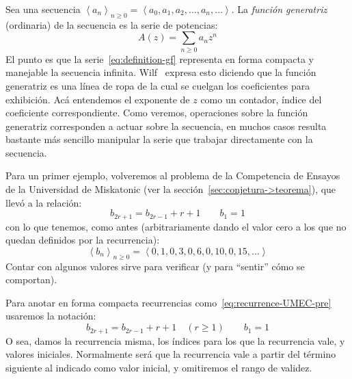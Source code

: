   Sea una secuencia
  \(\left\langle a_n \right\rangle_{n \ge 0}
     = \left\langle
	 a_0, a_1, a_2, \dotsc, a_n, \dotsc
       \right\rangle\).
  La \emph{función generatriz} (ordinaria) de la secuencia es
  la serie de potencias:%
  \begin{equation}
    \label{eq:definition-gf}
    A(z) = \sum_{n \ge 0} a_n z^n
  \end{equation}
  El punto es que la serie~\eqref{eq:definition-gf}
  representa en forma compacta y manejable
  la secuencia infinita.
  Wilf~\cite{wilf06:_gfology} expresa esto
  diciendo que la función generatriz es una línea de ropa
  de la cual se cuelgan los coeficientes para exhibición.
  Acá entendemos el exponente de \(z\) como un contador,
  índice del coeficiente correspondiente.
  Como veremos,
  operaciones sobre la función generatriz
  corresponden a actuar sobre la secuencia,
  en muchos casos resulta bastante más sencillo manipular la serie
  que trabajar directamente con la secuencia.

  Para un primer ejemplo,
  volveremos al problema
  de la Competencia de Ensayos de la Universidad de Miskatonic
  (ver la sección~\ref{sec:conjetura->teorema}),
  que llevó a la relación:
  \begin{equation}
    \label{eq:recurrence-UMEC-pre}
    b_{2 r + 1} = b_{2 r - 1} + r + 1 \qquad b_1 = 1
  \end{equation}
  con lo que tenemos,
  como antes
  (arbitrariamente dando el valor cero
  a los que no quedan definidos por la recurrencia):
  \begin{equation*}
    \left\langle b_n \right\rangle_{n \ge 0}
      = \left\langle
	  0, 1, 0, 3, 0, 6, 0, 10, 0, 15, \dotsc
	\right\rangle
  \end{equation*}
  Contar con algunos valores sirve para verificar
  (y para ``sentir'' cómo se comportan).

  Para anotar en forma compacta recurrencias%
  como~\eqref{eq:recurrence-UMEC-pre}
  usaremos la notación:
  \begin{equation}
    \label{eq:recurrence-UMEC}
    b_{2 r + 1}
      = b_{2 r - 1} + r + 1
      \quad (r \ge 1)
      \qquad b_1 = 1
  \end{equation}
  O sea,
  damos la recurrencia misma,
  los índices para los que la recurrencia vale,
  y valores iniciales.
  Normalmente será
  que la recurrencia vale a partir del término siguiente
  al indicado como valor inicial,
  y omitiremos el rango de validez.

